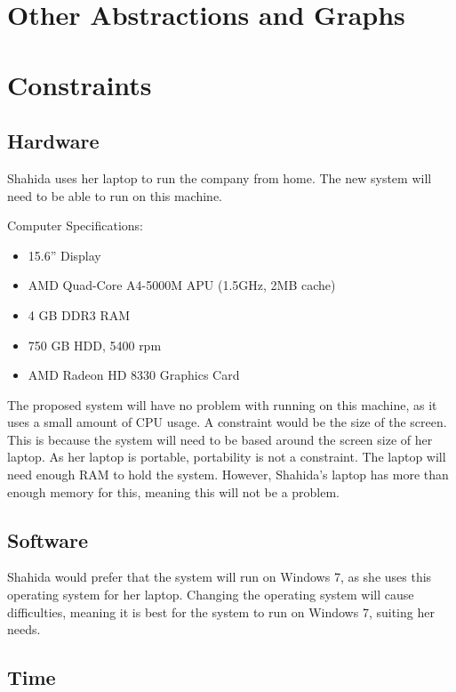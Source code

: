 \section{Other Abstractions and Graphs}

\section{Constraints}

\subsection{Hardware}
Shahida uses her laptop to run the company from home. The new system will need to be able to run on this machine.

Computer Specifications:

\begin{itemize}
    \item 15.6” Display
    \item AMD Quad-Core A4-5000M APU (1.5GHz, 2MB cache)
    \item 4 GB DDR3 RAM
    \item 750 GB HDD, 5400 rpm
    \item AMD Radeon HD 8330 Graphics Card
\end{itemize}

The proposed system will have no problem with running on this machine, as it uses a small amount of CPU usage. A constraint would be the size of the screen. This is because the system will need to be based around the screen size of her laptop. As her laptop is portable, portability is not a constraint. The laptop will need enough RAM to hold the system. However, Shahida's laptop has more than enough memory for this, meaning this will not be a problem. 

\subsection{Software}

Shahida would prefer that the system will run on Windows 7, as she uses this operating system for her laptop. Changing the operating system will cause difficulties, meaning it is best for the system to run on Windows 7, suiting her needs.

\subsection{Time}

